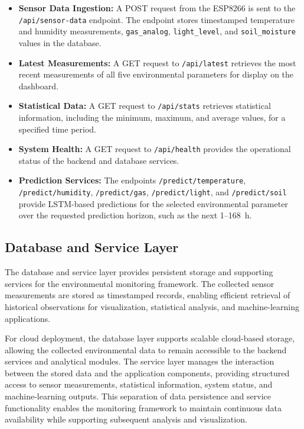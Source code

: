 ﻿\documentclass[journal]{IEEEtran}
\begin{document}
\begin{itemize}

    \item \textbf{Sensor Data Ingestion:} A POST request from the ESP8266 is
    sent to the \texttt{/api/sensor-data} endpoint. The endpoint stores
    timestamped temperature and humidity measurements, \texttt{gas\_analog},
    \texttt{light\_level}, and \texttt{soil\_moisture} values in the
    database.

    \item \textbf{Latest Measurements:} A GET request to
    \texttt{/api/latest} retrieves the most recent measurements of all five
    environmental parameters for display on the dashboard.

    \item \textbf{Statistical Data:} A GET request to
    \texttt{/api/stats} retrieves statistical information, including the
    minimum, maximum, and average values, for a specified time period.

    \item \textbf{System Health:} A GET request to
    \texttt{/api/health} provides the operational status of the backend and
    database services.

    \item \textbf{Prediction Services:} The endpoints
    \texttt{/predict/temperature}, \texttt{/predict/humidity},
    \texttt{/predict/gas}, \texttt{/predict/light}, and
    \texttt{/predict/soil} provide LSTM-based predictions for the selected
    environmental parameter over the requested prediction horizon, such as
    the next 1--168~h.

\end{itemize}


\subsection{Database and Service Layer}

The database and service layer provides persistent storage and supporting
services for the environmental monitoring framework. The collected sensor
measurements are stored as timestamped records, enabling efficient retrieval
of historical observations for visualization, statistical analysis, and
machine-learning applications.

For cloud deployment, the database layer supports scalable cloud-based
storage, allowing the collected environmental data to remain accessible to
the backend services and analytical modules. The service layer manages the
interaction between the stored data and the application components,
providing structured access to sensor measurements, statistical information,
system status, and machine-learning outputs. This separation of data
persistence and service functionality enables the monitoring framework to
maintain continuous data availability while supporting subsequent analysis
and visualization.
\end{document}
